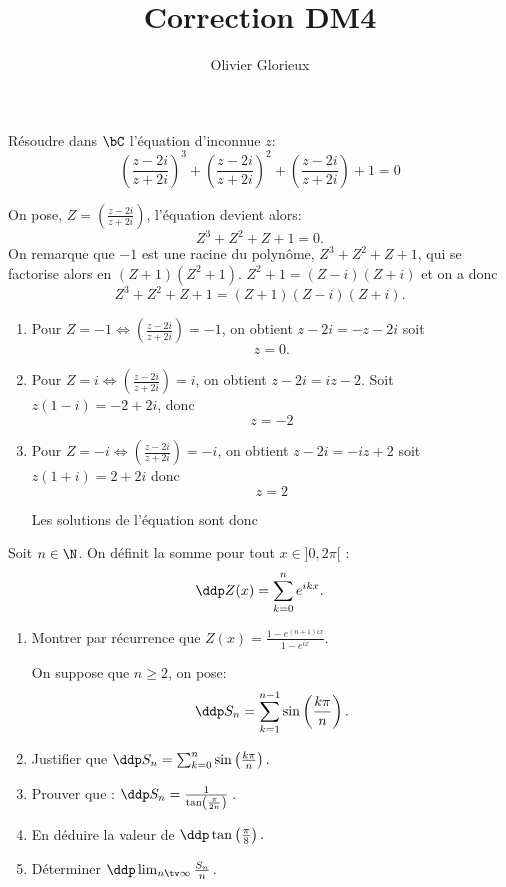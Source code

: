 \documentclass[a4paper, 11pt,reqno]{article}
\author{Olivier Glorieux}
\begin{document}
\title{Correction DM4 \\
}
\begin{exercice}
Résoudre dans $\bC$ l'équation d'inconnue $z$: 
$$\left(\frac{z-2i}{z+2i}\right)^3+\left(\frac{z-2i}{z+2i}\right)^2+\left(\frac{z-2i}{z+2i}\right)+1=0$$
\end{exercice}


\begin{correction}
On pose, $Z =\left(\frac{z-2i}{z+2i}\right)$, l'équation devient alors: 
$$Z^3+Z^2+Z+1=0.$$
On  remarque que $-1$ est une racine du polynôme,   $Z^3+Z^2+Z+1$, qui se factorise alors en 
$(Z+1)(Z^2+1)$. $Z^2+1 =(Z-i)(Z+i)$ et on  a donc 
$$Z^3+Z^2+Z+1 =(Z+1)(Z-i)(Z+i).$$

\begin{enumerate}
\item Pour $Z=-1 \Longleftrightarrow \left(\frac{z-2i}{z+2i}\right)=-1$, on obtient 
$z-2i =-z-2i$ soit $$z=0.$$
\item Pour $Z=i \Longleftrightarrow \left(\frac{z-2i}{z+2i}\right)=i$, on obtient 
$z-2i =iz-2$. Soit $z(1-i) = -2+2i$, donc 
$$z=-2$$


\item Pour $Z=-i \Longleftrightarrow \left(\frac{z-2i}{z+2i}\right)=-i$, on obtient 
$z-2i =-iz+2$ soit $z(1+i) =2+2i$ donc 
$$z=2$$



Les solutions de l'équation sont donc 

\end{enumerate}
\end{correction}


\begin{exercice}
 Soit  $n\in \N$. On définit la somme pour tout $x \in ]0, 2\pi[$ :
$$\ddp Z(x) =\sum_{k=0}^n e^{ikx}.$$
\begin{enumerate}
\item Montrer par récurrence que $Z(x) = \frac{1-e^{(n+1)ix}}{1-e^{ix}}$.

On suppose que $n\geq 2$, on pose: 
$$\ddp S_n = \sum_{k=1}^{n-1} \sin \left( \frac{k\pi}{n}\right).$$
\item Justifier que $\ddp S_n = \sum_{k=0}^{n} \sin \left( \frac{k\pi}{n}\right).$\\
\item Prouver que : $\ddp S_n = \frac{1}{ \tan \left( \frac{\pi}{2n}\right)}\, $.\\
\item En déduire la valeur de $\ddp \tan \left( \frac{\pi}{8}\right).$\\
\item Déterminer $\ddp \lim_{n\tv \infty} \frac{S_n}{n}\, .$
\end{enumerate}
\end{exercice}
\end{document}
